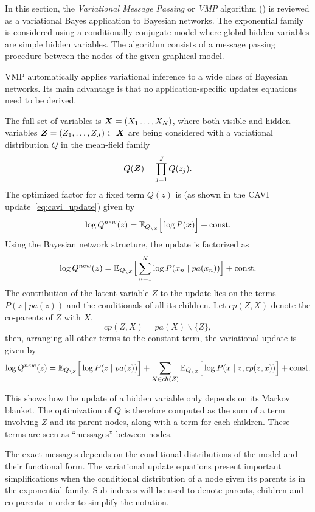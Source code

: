 
In this section, the \emph{Variational Message Passing} or \emph{VMP} algorithm (\cite{winn2005variational, bishop2003vibes}) is reviewed as a variational Bayes application to Bayesian networks. The exponential family is considered using a conditionally conjugate model where global hidden variables are simple hidden variables. The algorithm consists of a message passing procedure between the nodes of the given graphical model.

VMP automatically applies variational inference to a wide class of Bayesian networks. Its main advantage is that no application-specific updates equations need to be derived.

The full set of variables is \( \bm{X} = (X_1\dots,X_N) \), where both visible and hidden variables \( \bm{Z} = (Z_1,\dots,Z_J) \subset \bm{X}\) are being considered with a variational distribution \( Q \) in the mean-field family
\[
   Q(\bm{Z}) = \prod_{j=1}^J Q(z_j).
\]
The optimized factor for a fixed term \(Q(z)\) is (as shown in the CAVI update~\ref{eq:cavi_update}) given by
\begin{equation}\label{eq:vmp_update}
   \log Q^{new}(z) = \mathbb{E}_{Q_{\backslash Z}}\Big[\log P(\bm{x})\Big] + \text{const.}
\end{equation}
Using the Bayesian network structure, the update is factorized as
\[
  \log Q^{new}(z) = \mathbb{E}_{Q_{\backslash Z}}\Big[ \sum_{n=1}^N \log P(x_n \mid pa(x_n))\Big] + \text{const.}
\]
The contribution of the latent variable \(Z\) to the update lies on the terms \( P(z \mid pa(z)) \) and the conditionals of all its children. Let \(cp(Z,X)\) denote the co-parents of \(Z\) with \(X\),
\[
  cp(Z,X) = pa(X)\backslash \{Z\},
\]
then, arranging all other terms to the constant term, the variational update is given by
\begin{equation}\label{eq:vmp_update_open}
   \log Q^{new}(z) = \mathbb{E}_{Q_{\backslash Z}}\Big[\log P(z \mid pa(z))\Big] + \sum_{X \in ch(Z)} \mathbb{E}_{Q_{\backslash Z}}\Big[\log P(x \mid z,cp(z, x))\Big] + \text{const.}
\end{equation}

This shows how the update of a hidden variable only depends on its Markov blanket. The optimization of \( Q \) is therefore computed as the sum of a term involving \( Z \) and its parent nodes, along with a term for each children. These terms are seen as ``messages'' between nodes.

The exact messages depends on the conditional distributions of the model and their functional form. The variational update equations present important simplifications when the conditional distribution of a node given its parents is in the exponential family. Sub-indexes will be used to denote parents, children and co-parents in order to simplify the notation.

